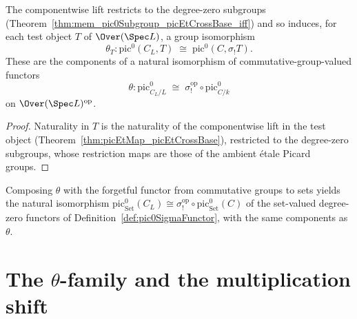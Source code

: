 \begin{definition}
  \label{def:pic0Theta}
  \leanok
  The componentwise lift restricts to the degree-zero subgroups
  (Theorem~\ref{thm:mem_pic0Subgroup_picEtCrossBase_iff}) and so induces, for each
  test object \(T\) of \(\Over(\Spec L)\), a group isomorphism
  \[
    \theta_T \colon \mathrm{pic}^0(C_L, T) \;\cong\; \mathrm{pic}^0(C, \sigma_{!}T).
  \]
  These are the components of a natural isomorphism of commutative-group-valued
  functors
  \[
    \theta \colon \mathrm{pic}^0_{C_L/L}
      \;\cong\; \sigma_{!}^{\mathrm{op}} \circ \mathrm{pic}^0_{C/k}
  \]
  on \(\Over(\Spec L)^{\mathrm{op}}\).
\end{definition}
\begin{proof}
  \leanok
  Naturality in \(T\) is the naturality of the componentwise lift in the test object
  (Theorem~\ref{thm:picEtMap_picEtCrossBase}), restricted to the degree-zero
  subgroups, whose restriction maps are those of the ambient \'etale Picard groups.
\end{proof}

\begin{definition}
  \label{def:pic0ThetaType}
  \leanok
  Composing \(\theta\) with the forgetful functor from commutative groups to sets
  yields the natural isomorphism
  \(\mathrm{pic}^0_{\mathrm{Set}}(C_L) \cong
    \sigma_{!}^{\mathrm{op}} \circ \mathrm{pic}^0_{\mathrm{Set}}(C)\)
  of the set-valued degree-zero functors of
  Definition~\ref{def:pic0SigmaFunctor}, with the same components as \(\theta\).
\end{definition}

\section{The \texorpdfstring{\(\theta\)}{theta}-family and the multiplication shift}
\label{sec:thetaShift}

